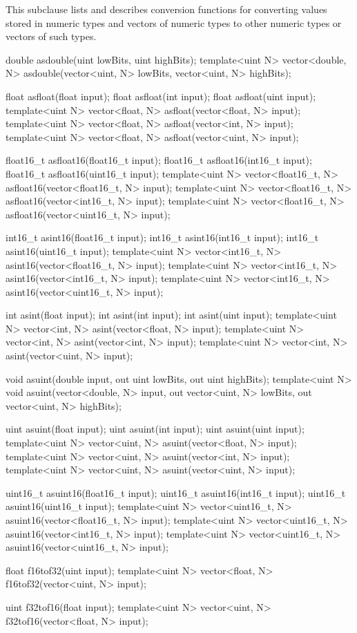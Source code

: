 
\p This subclause lists and describes conversion functions for converting values
stored in numeric types and vectors of numeric types to other numeric types or
vectors of such types.

\begin{HLSL}
double asdouble(uint lowBits, uint highBits);
template<uint N> vector<double, N> asdouble(vector<uint, N> lowBits, vector<uint, N> highBits);

float asfloat(float input);
float asfloat(int input);
float asfloat(uint input);
template<uint N> vector<float, N> asfloat(vector<float, N> input);
template<uint N> vector<float, N> asfloat(vector<int, N> input);
template<uint N> vector<float, N> asfloat(vector<uint, N> input);

float16_t asfloat16(float16_t input);
float16_t asfloat16(int16_t input);
float16_t asfloat16(uint16_t input);
template<uint N> vector<float16_t, N> asfloat16(vector<float16_t, N> input);
template<uint N> vector<float16_t, N> asfloat16(vector<int16_t, N> input);
template<uint N> vector<float16_t, N> asfloat16(vector<uint16_t, N> input);

int16_t asint16(float16_t input);
int16_t asint16(int16_t input);
int16_t asint16(uint16_t input);
template<uint N> vector<int16_t, N> asint16(vector<float16_t, N> input);
template<uint N> vector<int16_t, N> asint16(vector<int16_t, N> input);
template<uint N> vector<int16_t, N> asint16(vector<uint16_t, N> input);

int asint(float input);
int asint(int input);
int asint(uint input);
template<uint N> vector<int, N> asint(vector<float, N> input);
template<uint N> vector<int, N> asint(vector<int, N> input);
template<uint N> vector<int, N> asint(vector<uint, N> input);

void asuint(double input, out uint lowBits, out uint highBits);
template<uint N> void asuint(vector<double, N> input, out vector<uint, N> lowBits, out vector<uint, N> highBits);

uint asuint(float input);
uint asuint(int input);
uint asuint(uint input);
template<uint N> vector<uint, N> asuint(vector<float, N> input);
template<uint N> vector<uint, N> asuint(vector<int, N> input);
template<uint N> vector<uint, N> asuint(vector<uint, N> input);

uint16_t asuint16(float16_t input);
uint16_t asuint16(int16_t input);
uint16_t asuint16(uint16_t input);
template<uint N> vector<uint16_t, N> asuint16(vector<float16_t, N> input);
template<uint N> vector<uint16_t, N> asuint16(vector<int16_t, N> input);
template<uint N> vector<uint16_t, N> asuint16(vector<uint16_t, N> input);

float f16tof32(uint input);
template<uint N> vector<float, N> f16tof32(vector<uint, N> input);

uint f32tof16(float input);
template<uint N> vector<uint, N> f32tof16(vector<float, N> input);
\end{HLSL}

